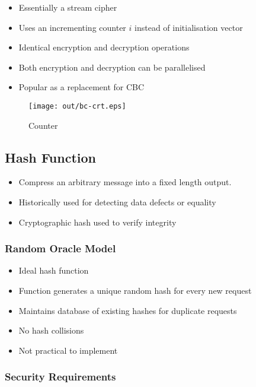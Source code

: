 \documentclass[a4paper]{article}
\begin{document}

\begin{itemize}
  \item Essentially a stream cipher
  \item Uses an incrementing counter $i$ instead of initialisation vector
  \item Identical encryption and decryption operations
  \item Both encryption and decryption can be parallelised
  \item Popular as a replacement for CBC
\end{itemize}

\begin{figure}[h!]
  \centering
  \texttt{[image: out/bc-crt.eps]}
  \caption{Counter}
  \label{fig:bc-crt}
\end{figure}
\FloatBarrier

\subsection{Hash Function}

\begin{itemize}
  \item Compress an arbitrary message into a fixed length output.
  \item Historically used for detecting data defects or equality
  \item Cryptographic hash used to verify integrity
\end{itemize}

\subsubsection{Random Oracle Model}

\begin{itemize}
  \item Ideal hash function
  \item Function generates a unique random hash for every new request
  \item Maintains database of existing hashes for duplicate requests
  \item No hash collisions
  \item Not practical to implement
\end{itemize}

\subsubsection{Security Requirements}
\end{document}
